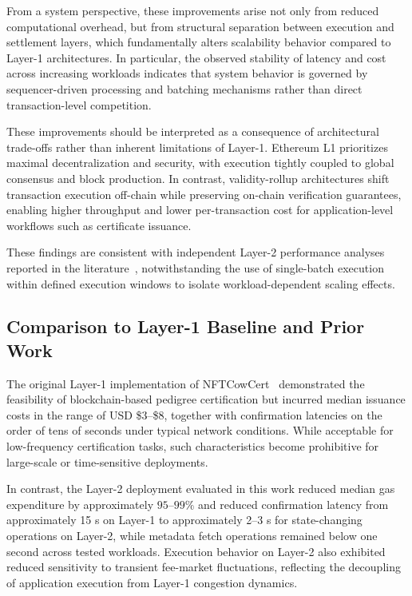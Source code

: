 \documentclass[pdflatex,sn-mathphys-num]{sn-jnl}
\begin{document}
From a system perspective, these improvements arise not only from reduced computational overhead, but from structural separation between execution and settlement layers, which fundamentally alters scalability behavior compared to Layer-1 architectures. In particular, the observed stability of latency and cost across increasing workloads indicates that system behavior is governed by sequencer-driven processing and batching mechanisms rather than direct transaction-level competition.

These improvements should be interpreted as a consequence of architectural trade-offs rather than inherent limitations of Layer-1. Ethereum L1 prioritizes maximal decentralization and security, with execution tightly coupled to global consensus and block production. In contrast, validity-rollup architectures shift transaction execution off-chain while preserving on-chain verification guarantees, enabling higher throughput and lower per-transaction cost for application-level workflows such as certificate issuance.

These findings are consistent with independent Layer-2 performance analyses reported in the literature~\cite{l2beat2024zk}, notwithstanding the use of single-batch execution within defined execution windows to isolate workload-dependent scaling effects.

\subsection{Comparison to Layer-1 Baseline and Prior Work}

The original Layer-1 implementation of NFTCowCert~\cite{bangnikrai2022blockchain} demonstrated the feasibility of blockchain-based pedigree certification but incurred median issuance costs in the range of USD \$3--\$8, together with confirmation latencies on the order of tens of seconds under typical network conditions. While acceptable for low-frequency certification tasks, such characteristics become prohibitive for large-scale or time-sensitive deployments.

In contrast, the Layer-2 deployment evaluated in this work reduced median gas expenditure by approximately $95$--$99\%$ and reduced confirmation latency from approximately 15 s on Layer-1 to approximately 2--3 s for state-changing operations on Layer-2, while metadata fetch operations remained below one second across tested workloads. Execution behavior on Layer-2 also exhibited reduced sensitivity to transient fee-market fluctuations, reflecting the decoupling of application execution from Layer-1 congestion dynamics.
\end{document}
